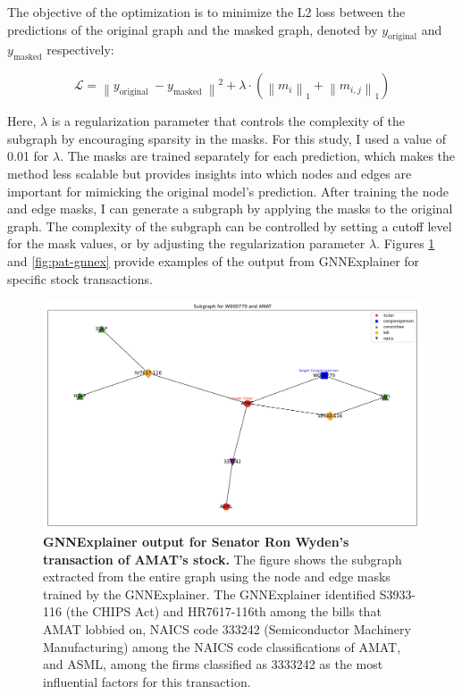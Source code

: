 \documentclass[15pt,letterpaper]{article}
\begin{document}
The objective of the optimization is to minimize the L2 loss between the predictions of the original graph and the masked graph, denoted by $y_{\text{original}}$ and $y_{\text{masked}}$ respectively:

$$
\mathcal{L}=\left\|y_{\text {original }}-y_{\text {masked }}\right\|^2+\lambda \cdot\left(\left\|m_i\right\|_1+\left\|m_{i, j}\right\|_1\right)
$$

Here, $\lambda$ is a regularization parameter that controls the complexity of the subgraph by encouraging sparsity in the masks. For this study, I used a value of 0.01 for $\lambda$.
The masks are trained separately for each prediction, which makes the method less scalable but provides insights into which nodes and edges are important for mimicking the original model's prediction. After training the node and edge masks, I can generate a subgraph by applying the masks to the original graph. The complexity of the subgraph can be controlled by setting a cutoff level for the mask values, or by adjusting the regularization parameter $\lambda$.
Figures \ref{fig:rw-amat} and \ref{fig:pat-gnnex} provide examples of the output from GNNExplainer for specific stock transactions.


\begin{figure}[h!]
  \centering
  \includegraphics[width=1.1\textwidth, height=0.4\textheight]{imgs/gnnex-rw-amat.png}
  \caption{\textbf{GNNExplainer output for Senator Ron Wyden's transaction of AMAT's stock.} The figure shows the subgraph extracted from the entire graph using the node and edge masks trained by the GNNExplainer. The GNNExplainer identified S3933-116 (the CHIPS Act) and HR7617-116th among the bills that AMAT lobbied on, NAICS code 333242 (Semiconductor Machinery Manufacturing) among the NAICS code classifications of AMAT, and ASML, among the firms classified as 3333242 as the most influential factors for this transaction.}
  \label{fig:rw-amat}
  \end{figure}
\end{document}
